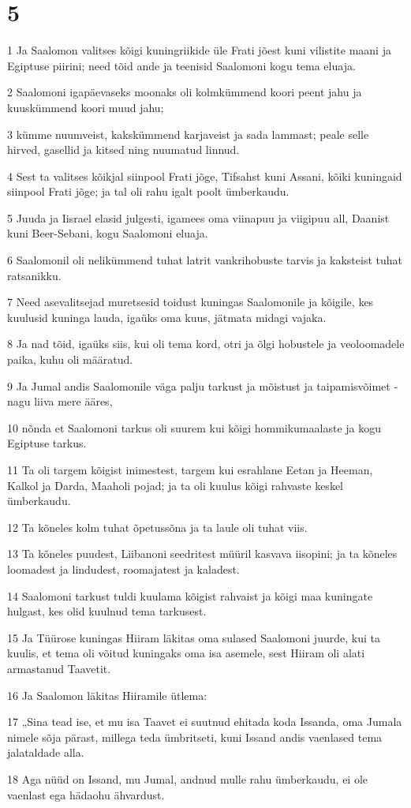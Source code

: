 \chapter{5}

\par 1 Ja Saalomon valitses kõigi kuningriikide üle Frati jõest kuni vilistite maani ja Egiptuse piirini; need tõid ande ja teenisid Saalomoni kogu tema eluaja.
\par 2 Saalomoni igapäevaseks moonaks oli kolmkümmend koori peent jahu ja kuuskümmend koori muud jahu;
\par 3 kümme nuumveist, kakskümmend karjaveist ja sada lammast; peale selle hirved, gasellid ja kitsed ning nuumatud linnud.
\par 4 Sest ta valitses kõikjal siinpool Frati jõge, Tifsahst kuni Assani, kõiki kuningaid siinpool Frati jõge; ja tal oli rahu igalt poolt ümberkaudu.
\par 5 Juuda ja Iisrael elasid julgesti, igamees oma viinapuu ja viigipuu all, Daanist kuni Beer-Sebani, kogu Saalomoni eluaja.
\par 6 Saalomonil oli nelikümmend tuhat latrit vankrihobuste tarvis ja kaksteist tuhat ratsanikku.
\par 7 Need asevalitsejad muretsesid toidust kuningas Saalomonile ja kõigile, kes kuulusid kuninga lauda, igaüks oma kuus, jätmata midagi vajaka.
\par 8 Ja nad tõid, igaüks siis, kui oli tema kord, otri ja õlgi hobustele ja veoloomadele paika, kuhu oli määratud.
\par 9 Ja Jumal andis Saalomonile väga palju tarkust ja mõistust ja taipamisvõimet - nagu liiva mere ääres,
\par 10 nõnda et Saalomoni tarkus oli suurem kui kõigi hommikumaalaste ja kogu Egiptuse tarkus.
\par 11 Ta oli targem kõigist inimestest, targem kui esrahlane Eetan ja Heeman, Kalkol ja Darda, Maaholi pojad; ja ta oli kuulus kõigi rahvaste keskel ümberkaudu.
\par 12 Ta kõneles kolm tuhat õpetussõna ja ta laule oli tuhat viis.
\par 13 Ta kõneles puudest, Liibanoni seedritest müüril kasvava iisopini; ja ta kõneles loomadest ja lindudest, roomajatest ja kaladest.
\par 14 Saalomoni tarkust tuldi kuulama kõigist rahvaist ja kõigi maa kuningate hulgast, kes olid kuulnud tema tarkusest.
\par 15 Ja Tüürose kuningas Hiiram läkitas oma sulased Saalomoni juurde, kui ta kuulis, et tema oli võitud kuningaks oma isa asemele, sest Hiiram oli alati armastanud Taavetit.
\par 16 Ja Saalomon läkitas Hiiramile ütlema:
\par 17 „Sina tead ise, et mu isa Taavet ei suutnud ehitada koda Issanda, oma Jumala nimele sõja pärast, millega teda ümbritseti, kuni Issand andis vaenlased tema jalataldade alla.
\par 18 Aga nüüd on Issand, mu Jumal, andnud mulle rahu ümberkaudu, ei ole vaenlast ega hädaohu ähvardust.

